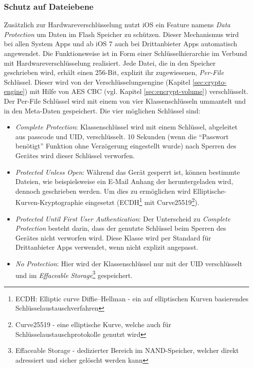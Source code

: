 	\subsubsection{Schutz auf Dateiebene}\label{sec:filesecurity}
		Zusätzlich zur Hardwareverschlüsselung nutzt iOS ein Feature namens
		\textsl{Data Protection} um Daten im Flash Speicher zu schützen. Dieser
		Mechanismus wird bei allen System Apps und ab iOS 7 auch bei Drittanbieter Apps
		automatisch angewendet. Die Funktionsweise ist in Form einer
		Schlüsselhierarchie im Verbund mit Hardwareverschlüsselung realisiert. Jede
		Datei, die in den Speicher geschrieben wird, erhält einen 256-Bit, explizit
		ihr zugewiesenen, \textsl{Per-File} Schlüssel. Dieser wird von der
		Verschlüsselungsengine (Kapitel \ref{sec:crypto-engine}) mit Hilfe von
		AES CBC (vgl. Kapitel \ref{sec:encrypt-volume})
		verschlüsselt. Der Per-File Schlüssel wird mit einem von vier
		Klassenschlüsseln ummantelt und in den Meta-Daten gespeichert. Die vier
		möglichen Schlüssel sind:
		\begin{itemize}
		  \item \textsl{Complete Protection}: Klassenschlüssel wird mit einem
		  Schlüssel, abgeleitet aus passcode und UID, verschlüsselt. 10 Sekunden (wenn
		  die "`Passwort benötigt"' Funktion ohne Verzögerung eingestellt wurde) nach
		  Sperren des Gerätes wird dieser Schlüssel verworfen.
		  \item \textsl{Protected Unless Open}: Während das Gerät gesperrt ist, können
		  bestimmte Dateien, wie beispielsweise ein E-Mail Anhang der heruntergeladen
		  wird, dennoch geschrieben werden. Um dies zu ermöglichen wird
		  Elliptische-Kurven-Kryptographie eingesetzt (ECDH\footnote{ECDH: Elliptic
		  curve Diffie–Hellman - ein auf elliptischen Kurven basierendes
		  Schlüsselaustauschverfahren} mit Curve25519\footnote{Curve25519 - eine
		  elliptische Kurve, welche auch für Schlüsselaustauschprotokolle genutzt
		  wird}).
		  \item \textsl{Protected Until First User Authentication}: Der Unterscheid zu
		  \textsl{Complete Protection} besteht darin, dass der genutzte Schlüssel
		  beim Sperren des Gerätes nicht verworfen wird. Diese Klasse wird per
		  Standard für Drittanbieter Apps verwendet, wenn nicht explizit angepasst.
		  \item \textsl{No Protection}: Hier wird der Klassenschlüssel nur mit der UID
		  verschlüsselt und im \textsl{Effaceable
		  Storage}\footnote{Effaceable Storage - dedizierter Bereich im NAND-Speicher,
		  welcher direkt adressiert und sicher gelöscht werden kann} gespeichert.
		\end{itemize}
